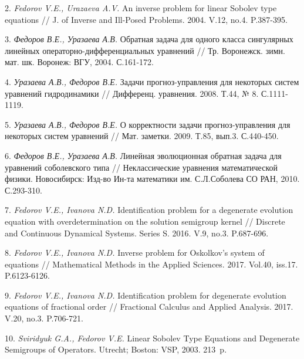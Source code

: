 2.	{\it Fedorov V.E., Urazaeva A.V.} An inverse problem for linear Sobolev type equations // J. of Inverse and Ill-Posed Problems. 2004. V.12, no.4. P.387-395.

3.	{\it Федоров В.Е., Уразаева А.В.} Обратная задача для одного класса сингулярных линейных операторно-диф\-фе\-рен\-ци\-аль\-ных уравнений // Тр. Воронежск. зимн. мат. шк. Воронеж: ВГУ, 2004. С.161-172.

4.	{\it Уразаева А.В., Федоров В.Е.} Задачи прогноз-управ\-ле\-ния для некоторых систем уравнений гидродинамики // Дифференц. уравнения. 2008. Т.44, № 8. С.1111-1119.

5.	{\it Уразаева А.В., Федоров В.Е.} О корректности задачи прогноз-управления для некоторых систем уравнений // Мат. заметки. 2009. Т.85, вып.3. С.440-450.

6.	{\it Федоров В.Е., Уразаева А.В.} Линейная эволюционная обратная задача для уравнений соболевского типа // Неклассические уравнения математической физики. Новосибирск: Изд-во Ин-та математики им. С.Л.Соболева СО РАН, 2010. С.293-310.

7.	{\it Fedorov V.E., Ivanova N.D.} Identification problem for a degenerate evolution equation with overdetermination on the solution semigroup kernel // Discrete and Continuous Dyna\-mi\-cal Systems. Series S. 2016. V.9, no.3. P.687-696.

8.	{\it Fedorov V.E., Ivanova N.D.} Inverse problem for Oskol\-kov’s system of equations // Mathematical Methods in the Applied Sciences. 2017. Vol.40, iss.17. P.6123-6126.

9.	{\it Fedorov V.E., Ivanova N.D.} Identification problem for degenerate evolution equations of fractional order // Fractional Calculus and Applied Analysis. 2017. V.20, no.3. P.706-721.

10.	{\it Sviridyuk G.A., Fedorov V.E.} Linear Sobolev Type Equ\-a\-ti\-ons and Degenerate Semigroups of Operators. Utrecht; Bos\-ton: VSP, 2003. 213~p.
